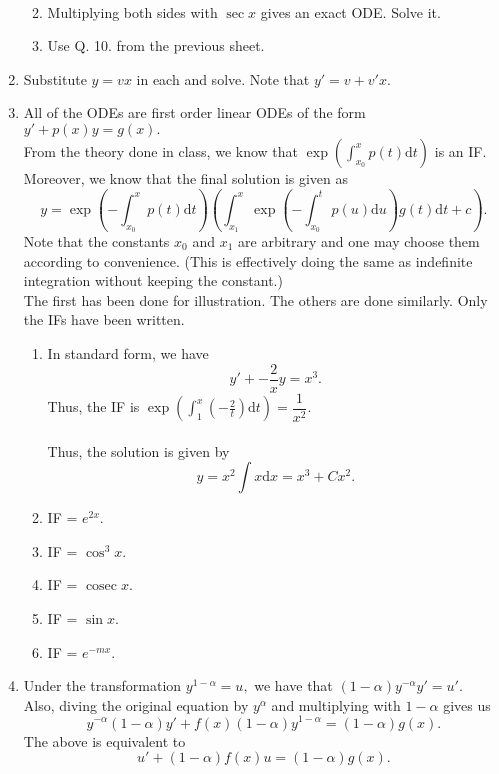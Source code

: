 \documentclass{article}
\begin{document}
\begin{enumerate}[label = Q.\arabic*.]
\begin{enumerate}[label = (\roman*)]
\begin{align*}
		\end{align*}
		\item Multiplying both sides with $\sec x$ gives an exact ODE. Solve it.
		\item Use Q. 10. from the previous sheet.
	\end{enumerate}
	\item Substitute $y = vx$ in each and solve. Note that $y' = v + v'x.$
	\item All of the ODEs are first order linear ODEs of the form $y' + p(x)y = g(x).$\\
	From the theory done in class, we know that $\exp\left(\displaystyle\int_{x_0}^{x} p(t) \text{d}t\right)$ is an IF.\\
	Moreover, we know that the final solution is given as 
	\[y = \exp\left(-\displaystyle\int_{x_0}^{x} p(t) \text{d}t\right)\left(\int_{x_1}^{x} \exp\left(-\displaystyle\int_{x_0}^{t} p(u) \text{d}u\right)g(t) \text{d}t + c\right).\]
	Note that the constants $x_0$ and $x_1$ are arbitrary and one may choose them according to convenience. (This is effectively doing the same as indefinite integration without keeping the constant.)\\
	The first has been done for illustration. The others are done similarly. Only the IFs have been written.
	\begin{enumerate}[label = (\roman*)] 
		\item In standard form, we have
		\[y' + -\frac{2}{x}y = x^3.\]
		Thus, the IF is $\displaystyle\exp\left(\int_{1}^{x} \left(-\frac{2}{t}\right) \text{d}t\right) = \dfrac{1}{x^2}.$\\~\\
		Thus, the solution is given by
		\[y = x^2\int x \text{d}x = x^3 + Cx^2.\]
		\item IF = $e^{2x}.$
		\item IF = $\cos^3 x.$
		\item IF = $\operatorname{cosec} x.$
		\item IF = $\sin x.$
		\item IF = $e^{-mx}.$
	\end{enumerate}
	\item Under the transformation $y^{1 - \alpha} = u,$ we have that $(1 - \alpha)y^{-\alpha} y' = u'.$\\
	Also, diving the original equation by $y^\alpha$ and multiplying with $1 - \alpha$ gives us
	\[y^{-\alpha}(1 - \alpha)y' + f(x)(1 - \alpha)y^{1-\alpha} = (1 - \alpha)g(x).\]
	The above is equivalent to
	\[u' + (1 - \alpha)f(x)u = (1 - \alpha)g(x).\]

\end{enumerate}
\end{document}
